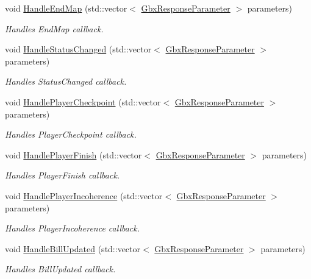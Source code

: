\begin{DoxyCompactItemize}
void \hyperlink{classCallBackManager_ac31e15ec293f178222e8f73dbce963da}{Handle\-End\-Map} (std\-::vector$<$ \hyperlink{classGbxResponseParameter}{Gbx\-Response\-Parameter} $>$ parameters)
\begin{DoxyCompactList}\small\item\em Handles End\-Map callback. \end{DoxyCompactList}\item 
void \hyperlink{classCallBackManager_acadb67344d217a028fe21163bf74e5cd}{Handle\-Status\-Changed} (std\-::vector$<$ \hyperlink{classGbxResponseParameter}{Gbx\-Response\-Parameter} $>$ parameters)
\begin{DoxyCompactList}\small\item\em Handles Status\-Changed callback. \end{DoxyCompactList}\item 
void \hyperlink{classCallBackManager_a350cfbe5f81c1039c8db53e0d6fb5ec5}{Handle\-Player\-Checkpoint} (std\-::vector$<$ \hyperlink{classGbxResponseParameter}{Gbx\-Response\-Parameter} $>$ parameters)
\begin{DoxyCompactList}\small\item\em Handles Player\-Checkpoint callback. \end{DoxyCompactList}\item 
void \hyperlink{classCallBackManager_aef1c327689b54fa2323ab5508b561c43}{Handle\-Player\-Finish} (std\-::vector$<$ \hyperlink{classGbxResponseParameter}{Gbx\-Response\-Parameter} $>$ parameters)
\begin{DoxyCompactList}\small\item\em Handles Player\-Finish callback. \end{DoxyCompactList}\item 
void \hyperlink{classCallBackManager_a8e3a29366a205d0fbeb2bafb4226d0bd}{Handle\-Player\-Incoherence} (std\-::vector$<$ \hyperlink{classGbxResponseParameter}{Gbx\-Response\-Parameter} $>$ parameters)
\begin{DoxyCompactList}\small\item\em Handles Player\-Incoherence callback. \end{DoxyCompactList}\item 
void \hyperlink{classCallBackManager_a04ae5c8b9c11709fe19229037f891902}{Handle\-Bill\-Updated} (std\-::vector$<$ \hyperlink{classGbxResponseParameter}{Gbx\-Response\-Parameter} $>$ parameters)
\begin{DoxyCompactList}\small\item\em Handles Bill\-Updated callback. \end{DoxyCompactList}\item 

\end{DoxyCompactItemize}
